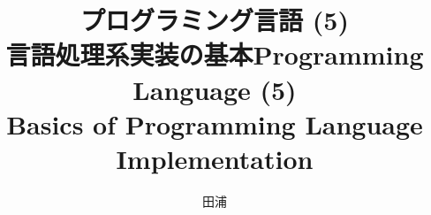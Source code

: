 \documentclass[12pt,dvipdfmx]{beamer}
\title{プログラミング言語 (5) \\ 言語処理系実装の基本}
\title{Programming Language (5) \\
    Basics of Programming Language Implementation}
\institute{}
\author{田浦}
\date{}
\newif\ifen
\newif\ifja
\newcommand{\ao}[1]{{\color{blue}#1}}
\begin{document}
\maketitle

\begin{frame}
\ifja
\frametitle{目次}
\fi
\ifen
\frametitle{Contents}
\fi
\tableofcontents
\end{frame}

\ifja
\section{はじめに}
\fi
\ifen
\section{Introduction}
\fi

\ifja
\begin{frame}
\frametitle{言語処理系実装の形態}
\begin{itemize}
\item \ao{インタプリタ:} プログラムを解釈実行(プログラムと入力から出力を直接計算)
\item \ao{トランスレータ:} プログラムを別の言語(例: C)に翻訳
  \begin{itemize}
  \item 例: OpenMP (Cの並列拡張) を C (+ Pthreads) に翻訳
  \end{itemize}
\item \ao{コンパイラ:} プログラムを機械語に翻訳
\end{itemize}
\end{frame}
\fi

\ifen
\begin{frame}
\frametitle{Two basic forms of language implementation}
\begin{itemize}
\item \ao{interpreter:} interprets and executes programs
  (takes a program and an input; and computes the output)
\item \ao{compiler:} translates programs into \ao{a machine (assembly) code},
  that can directly execute by the processor
  \begin{itemize}
  \item \ao{ahead-of-time (AOT):} the entire program is compiled before execution
  \item \ao{just-in-time (JIT):} programs are incrementally compiled as they get executed
    (e.g., a function at a time)
  \end{itemize}
\end{itemize}

{\it regardless of details, the central issue is how to translate
  \ao{a source program $\rightarrow$ machine code}}

\end{frame}
\fi
\end{document}
